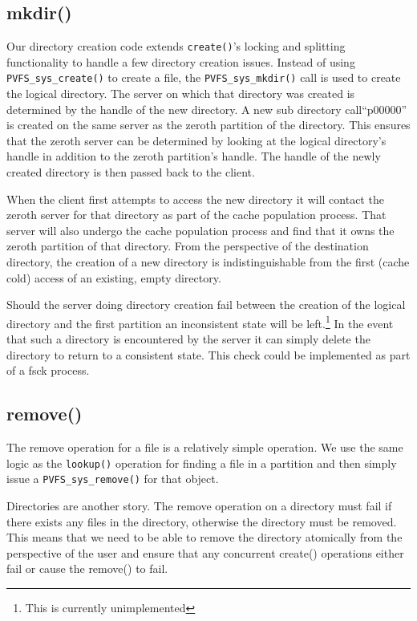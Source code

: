 \documentclass[letterpaper]{article}
\newcommand{\code}[1]{\texttt{#1}}
\begin{document}
\subsection{mkdir()}
Our directory creation code extends \code{create()}'s locking and splitting
functionality to handle a few directory creation issues.  Instead of using
\code{PVFS\_\-sys\_\-create()} to create a file, the \code{PVFS\_\-sys\_\-mkdir()} call is
used to create the logical directory.  The server on which that directory was
created is determined by the handle of the new directory.  A new sub directory
call``p00000'' is created on the same server as the zeroth partition of the
directory.  This ensures that the zeroth server can be determined by looking
at the logical directory's handle in addition to the zeroth partition's handle.
The handle of the newly created directory is then passed back to the client.

When the client first attempts to access the new directory it will contact the
zeroth server for that directory as part of the cache population process.  That
server will also undergo the cache population process and find that it owns the
zeroth partition of that directory.  From the perspective of the destination
directory, the creation of a new directory is indistinguishable from the first
(cache cold) access of an existing, empty directory.

Should the server doing directory creation fail between the creation of the
logical directory and the first partition an inconsistent state will be
left.\footnote{This is currently unimplemented}  In the event that such a
directory is encountered by the server it can simply delete the directory to
return to a consistent state.  This check could be implemented as part of a
fsck process.

\subsection{remove()}
The remove operation for a file is a relatively simple operation.  We use the
same logic as the \code{lookup()} operation for finding a file in a partition
and then simply issue a \code{PVFS\_\-sys\_\-remove()} for that object.

Directories are another story.  The remove operation on a directory must fail if
there exists any files in the directory, otherwise the directory must be
removed.  This means that we need to be able to remove the directory
atomically from the perspective of the user and ensure that any concurrent
create() operations either fail or cause the remove() to fail.
\end{document}

